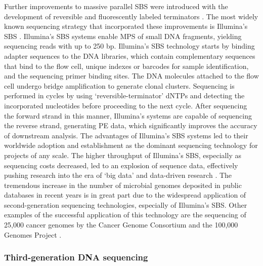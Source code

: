 Further improvements to massive parallel \ac{SBS} were introduced with the development of reversible and fluorescently labeled terminators \cite{turcatti_new_2008}. The most widely known sequencing strategy that incorporated these improvements is Illumina’s \ac{SBS} \cite{uhlen_sequential_2023, bentley_accurate_2008, fedurco_bta_2006}. Illumina’s \ac{SBS} systems enable \ac{MPS} of small DNA fragments, yielding sequencing reads with up to 250 bp. Illumina’s \ac{SBS} technology starts by binding adapter sequences to the \ac{DNA} libraries, which contain complementary sequences that bind to the flow cell, unique indexes or barcodes for sample identification, and the sequencing primer binding sites. The \ac{DNA} molecules attached to the flow cell undergo bridge amplification to generate clonal clusters. Sequencing is performed in cycles by using ‘reversible-terminator’ dNTPs and detecting the incorporated nucleotides before proceeding to the next cycle. After sequencing the forward strand in this manner, Illumina’s systems are capable of sequencing the reverse strand, generating \ac{PE} data, which significantly improves the accuracy of downstream analysis. The advantages of Illumina’s \ac{SBS} systems led to their worldwide adoption and establishment as the dominant sequencing technology for projects of any scale. The higher throughput of Illumina’s \ac{SBS}, especially as sequencing costs decreased, led to an explosion of sequence data, effectively pushing research into the era of ‘big data’ and data-driven research \cite{uhlen_sequential_2023}. The tremendous increase in the number of microbial genomes deposited in public databases in recent years is in great part due to the widespread application of second-generation sequencing technologies, especially of Illumina’s \ac{SBS}. Other examples of the successful application of this technology are the sequencing of 25,000 cancer genomes by the Cancer Genome Consortium \cite{zhang_international_2019} and the 100,000 Genomes Project \cite{the_100000_genomes_project_pilot_investigators_100000_2021}.

\subsubsection{Third-generation DNA sequencing}

